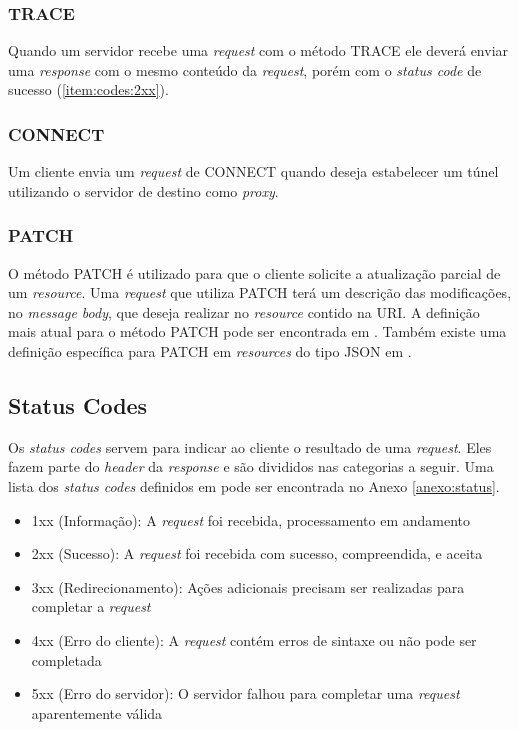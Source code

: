 
\subsubsection{TRACE}
Quando um servidor recebe uma \textit{request} com o método TRACE ele deverá enviar uma \textit{response} com o mesmo conteúdo da \textit{request}, porém com o \textit{status code} de sucesso (\ref{item:codes:2xx}).

\subsubsection{CONNECT}
Um cliente envia um \textit{request} de CONNECT quando deseja estabelecer um túnel utilizando o servidor de destino como \textit{proxy}.

\subsubsection{PATCH}
O método PATCH é utilizado para que o cliente solicite a atualização parcial de um \textit{resource}. Uma \textit{request} que utiliza PATCH terá um descrição das modificações, no \textit{message body}, que deseja realizar no \textit{resource} contido na URI. A definição mais atual para o método PATCH pode ser encontrada em \cite{RFC5789}. Também existe uma definição específica para PATCH em \textit{resources} do tipo JSON em .

\subsection{Status Codes}
\label{sec:http:status}

Os \textit{status codes} servem para indicar ao cliente o resultado de uma \textit{request}. Eles fazem parte do \textit{header} da \textit{response} e são divididos nas categorias a seguir. Uma lista dos \textit{status codes} definidos em  pode ser encontrada no Anexo \ref{anexo:status}.

\begin{itemize}
    \item 1xx (Informação): A \textit{request} foi recebida, processamento em andamento
    \item 2xx \label{item:codes:2xx}(Sucesso): A \textit{request} foi recebida com sucesso, compreendida, e aceita
    \item 3xx (Redirecionamento): Ações adicionais precisam ser realizadas para completar a \textit{request}
    \item 4xx (Erro do cliente): A \textit{request} contém erros de sintaxe ou não pode ser completada
    \item 5xx (Erro do servidor): O servidor falhou para completar uma \textit{request} aparentemente válida
\end{itemize}